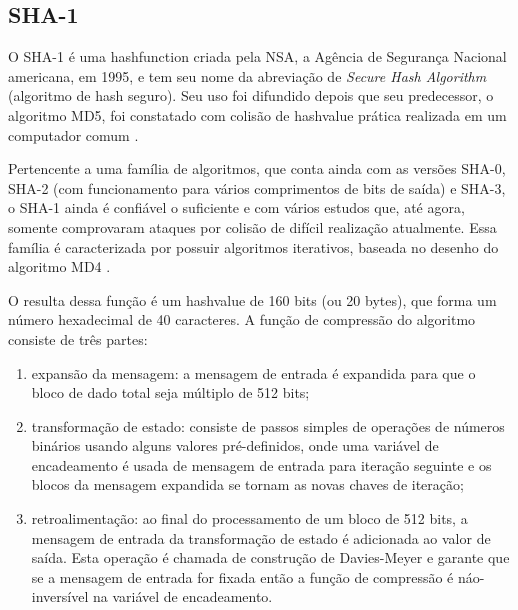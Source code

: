 
\subsection*{SHA-1}

O SHA-1 é uma \gls*{hashfunction} criada pela NSA, a Agência de Segurança Nacional
americana, em 1995, e tem seu nome da abreviação de \emph{Secure Hash Algorithm}
(algoritmo de hash seguro). Seu uso foi difundido depois que seu predecessor, o
algoritmo MD5, foi constatado com colisão de \gls*{hashvalue} prática realizada em um
computador comum \cite{report:md5-attack}.

Pertencente a uma família de algoritmos, que conta ainda com as versões SHA-0, SHA-2
(com funcionamento para vários comprimentos de bits de saída) e SHA-3, o SHA-1 ainda é
confiável o suficiente e com vários estudos que, até agora, somente comprovaram ataques
por colisão de difícil realização atualmente. Essa família é caracterizada por possuir
algoritmos iterativos, baseada no desenho do algoritmo MD4 \cite{report:md4}.

O resulta dessa função é um \gls*{hashvalue} de 160 bits (ou 20 bytes), que forma um
número hexadecimal de 40 caracteres. A função de compressão do algoritmo consiste de
três partes:

\begin{enumerate}
    \item expansão da mensagem: a mensagem de entrada é expandida para que o bloco de
        dado total seja múltiplo de 512 bits;

    \item transformação de estado: consiste de passos simples de operações de números
        binários usando alguns valores pré-definidos, onde uma variável de encadeamento
        é usada de mensagem de entrada para iteração seguinte e os blocos da mensagem
        expandida se tornam as novas chaves de iteração;

    \item retroalimentação: ao final do processamento de um bloco de 512 bits, a
        mensagem de entrada da transformação de estado é adicionada ao valor de saída.
        Esta operação é chamada de construção de Davies-Meyer e garante que se a
        mensagem de entrada for fixada então a função de compressão é náo-inversível na
        variável de encadeamento.
\end{enumerate}

